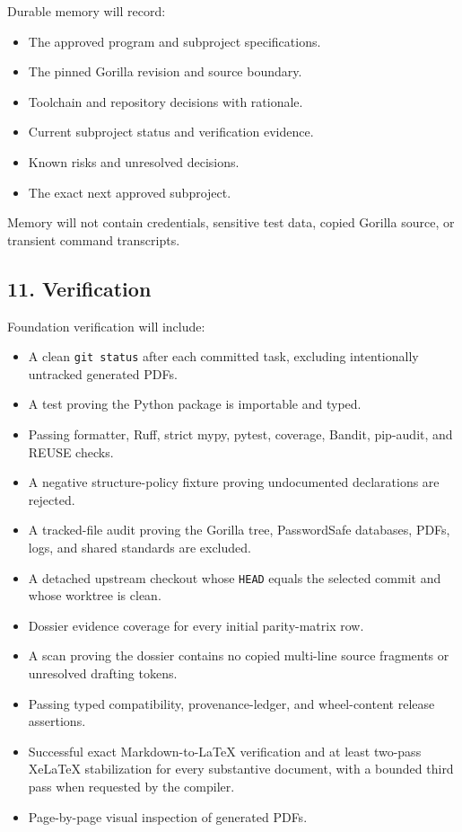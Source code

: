 \documentclass[
  letterpaper,
]{article}
\newcommand{\passthrough}[1]{#1}
\providecommand{\tightlist}{%
  \setlength{\itemsep}{0pt}\setlength{\parskip}{0pt}}
\begin{document}
Durable memory will record:

\begin{itemize}
\tightlist
\item
  The approved program and subproject specifications.
\item
  The pinned Gorilla revision and source boundary.
\item
  Toolchain and repository decisions with rationale.
\item
  Current subproject status and verification evidence.
\item
  Known risks and unresolved decisions.
\item
  The exact next approved subproject.
\end{itemize}

Memory will not contain credentials, sensitive test data, copied Gorilla source, or transient command transcripts.

\subsection{11. Verification}\label{11-verification}

Foundation verification will include:

\begin{itemize}
\tightlist
\item
  A clean \passthrough{\lstinline!git status!} after each committed task, excluding intentionally untracked generated
  PDFs.
\item
  A test proving the Python package is importable and typed.
\item
  Passing formatter, Ruff, strict mypy, pytest, coverage, Bandit, pip-audit, and REUSE checks.
\item
  A negative structure-policy fixture proving undocumented declarations are rejected.
\item
  A tracked-file audit proving the Gorilla tree, PasswordSafe databases, PDFs, logs, and shared standards are excluded.
\item
  A detached upstream checkout whose \passthrough{\lstinline!HEAD!} equals the selected commit and whose worktree is
  clean.
\item
  Dossier evidence coverage for every initial parity-matrix row.
\item
  A scan proving the dossier contains no copied multi-line source fragments or unresolved drafting tokens.
\item
  Passing typed compatibility, provenance-ledger, and wheel-content release assertions.
\item
  Successful exact Markdown-to-LaTeX verification and at least two-pass XeLaTeX stabilization for every substantive
  document, with a bounded third pass when requested by the compiler.
\item
  Page-by-page visual inspection of generated PDFs.
\end{itemize}
\end{document}
